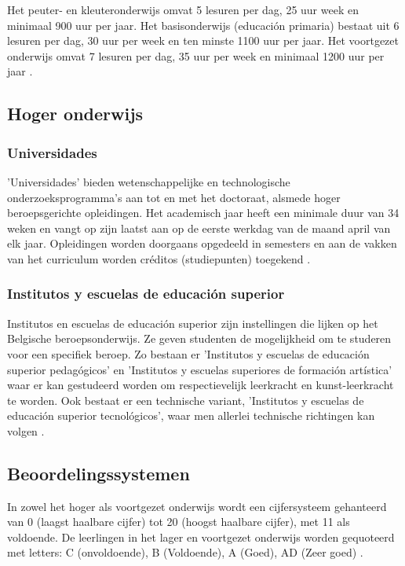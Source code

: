 Het peuter- en kleuteronderwijs omvat 5 lesuren per dag, 25 uur week en minimaal 900 uur per jaar. Het basisonderwijs (educación primaria) bestaat uit 6 lesuren per dag, 30 uur per week en ten minste 1100 uur per jaar. Het voortgezet onderwijs omvat 7 lesuren per dag, 35 uur per week en minimaal 1200 uur per jaar \autocite{Nuffic2015}.



\subsection{Hoger onderwijs}
\subsubsection{Universidades}
 'Universidades' bieden wetenschappelijke en technologische onderzoeksprogramma’s aan tot en met het doctoraat, alsmede hoger beroepsgerichte opleidingen. Het academisch jaar heeft een minimale duur van 34 weken en vangt op zijn laatst aan op de eerste werkdag van de maand april van elk jaar. Opleidingen worden doorgaans opgedeeld in semesters en aan de vakken van het curriculum worden créditos (studiepunten) toegekend \autocite{Nuffic2015}.
 
 \subsubsection{Institutos y escuelas de educación superior }
Institutos en escuelas de educación superior zijn instellingen die lijken op het Belgische beroepsonderwijs. Ze geven studenten de mogelijkheid om te studeren voor een specifiek beroep. Zo bestaan er 'Institutos y escuelas de educación superior pedagógicos' en 'Institutos y escuelas superiores de formación artística' waar er kan gestudeerd worden om respectievelijk leerkracht en kunst-leerkracht te worden. Ook bestaat er een technische variant, 'Institutos y escuelas de educación superior tecnológicos', waar men allerlei technische richtingen kan volgen \autocite{Nuffic2015}.



\subsection{Beoordelingssystemen}
In zowel het hoger als voortgezet onderwijs wordt een cijfersysteem gehanteerd van 0 (laagst haalbare cijfer) tot 20 (hoogst haalbare cijfer), met 11 als voldoende. De leerlingen in het lager en voortgezet onderwijs worden gequoteerd met letters: C (onvoldoende), B (Voldoende), A (Goed), AD (Zeer goed) \autocite{Nuffic2015}.

